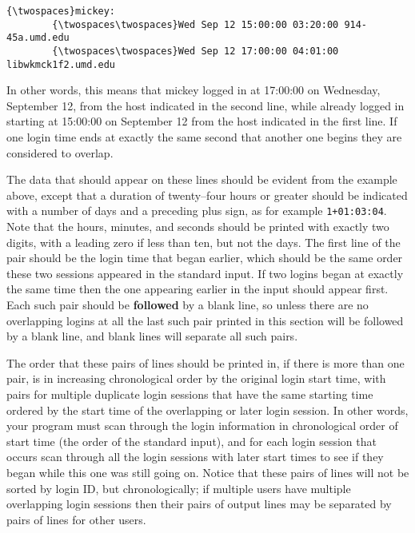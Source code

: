 \documentclass[11pt]{article}
\newcommand{\twospaces}{\UseVerb{Verb}\UseVerb{Verb}}
\begin{document}
        \begin{centering}

          \begin{BVerbatim}[showspaces,commandchars=\\\{\}]
        {\twospaces}mickey:
        {\twospaces\twospaces}Wed Sep 12 15:00:00 03:20:00 914-45a.umd.edu
        {\twospaces\twospaces}Wed Sep 12 17:00:00 04:01:00 libwkmck1f2.umd.edu
          \end{BVerbatim}

        \end{centering}

        \medskip\smallskip

        In other words, this means that mickey logged in at 17:00:00 on
      Wednesday, September 12, from the host indicated in the second line,
      while already logged in starting at 15:00:00 on September 12 from the
      host indicated in the first line.  If one login time ends at exactly
      the same second that another one begins they are considered to
      overlap.

        The data that should appear on these lines should be evident from the
      example above, except that a duration of twenty--four hours or greater
      should be indicated with a number of days and a preceding plus sign,
      as for example \texttt{1+01:03:04}.  Note that the hours, minutes, and
      seconds should be printed with exactly two digits, with a leading
      zero if less than ten, but not the days.  The first line of the pair
      should be the login time that began earlier, which should be the
      same order these two sessions appeared in the standard input.  If two
      logins began at exactly the same time then the one appearing earlier
      in the input should appear first.  Each such pair should be
      \textbf{followed} by a blank line, so unless there are no overlapping
      logins at all the last such pair printed in this section will be
      followed by a blank line, and blank lines will separate all such
      pairs.

        \enlargethispage{4mm}

        The order that these pairs of lines should be printed in, if there is
      more than one pair, is in increasing chronological order by the
      original login start time, with pairs for multiple duplicate login
      sessions that have the same starting time ordered by the start time of
      the overlapping or later login session.  In other words, your program
      must scan through the login information in chronological order of
      start time (the order of the standard input), and for each login
      session that occurs scan through all the login sessions with later
      start times to see if they began while this one was still going on.
      Notice that these pairs of lines will not be sorted by login ID, but
      chronologically; if multiple users have multiple overlapping login
      sessions then their pairs of output lines may be separated by pairs of
      lines for other users.
\end{document}
